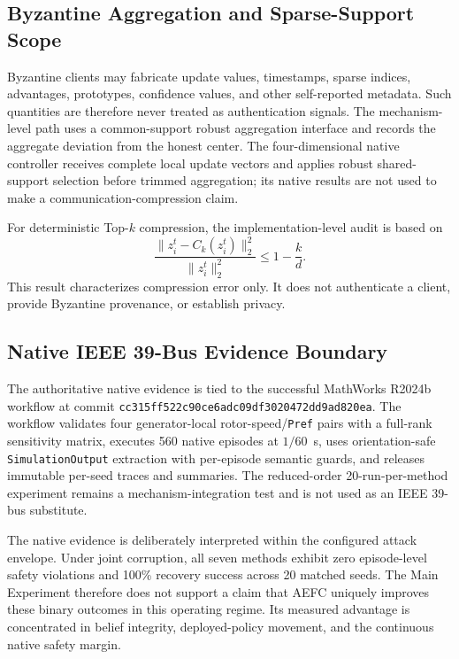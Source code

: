 \subsection{Byzantine Aggregation and Sparse-Support Scope}
Byzantine clients may fabricate update values, timestamps, sparse indices, advantages, prototypes, confidence values, and other self-reported metadata. Such quantities are therefore never treated as authentication signals. The mechanism-level path uses a common-support robust aggregation interface and records the aggregate deviation from the honest center. The four-dimensional native controller receives complete local update vectors and applies robust shared-support selection before trimmed aggregation; its native results are not used to make a communication-compression claim.

For deterministic Top-$k$ compression, the implementation-level audit is based on
\begin{equation}
\frac{\|z_i^t-C_k(z_i^t)\|_2^2}{\|z_i^t\|_2^2}
\le1-\frac{k}{d}.
\end{equation}
This result characterizes compression error only. It does not authenticate a client, provide Byzantine provenance, or establish privacy.

\subsection{Native IEEE 39-Bus Evidence Boundary}
The authoritative native evidence is tied to the successful MathWorks R2024b workflow at commit \texttt{cc315ff522c90ce6adc09df3020472dd9ad820ea}. The workflow validates four generator-local rotor-speed/\texttt{Pref} pairs with a full-rank sensitivity matrix, executes 560 native episodes at $1/60$~s, uses orientation-safe \texttt{SimulationOutput} extraction with per-episode semantic guards, and releases immutable per-seed traces and summaries. The reduced-order 20-run-per-method experiment remains a mechanism-integration test and is not used as an IEEE 39-bus substitute.

The native evidence is deliberately interpreted within the configured attack envelope. Under joint corruption, all seven methods exhibit zero episode-level safety violations and 100\% recovery success across 20 matched seeds. The Main Experiment therefore does not support a claim that AEFC uniquely improves these binary outcomes in this operating regime. Its measured advantage is concentrated in belief integrity, deployed-policy movement, and the continuous native safety margin.

